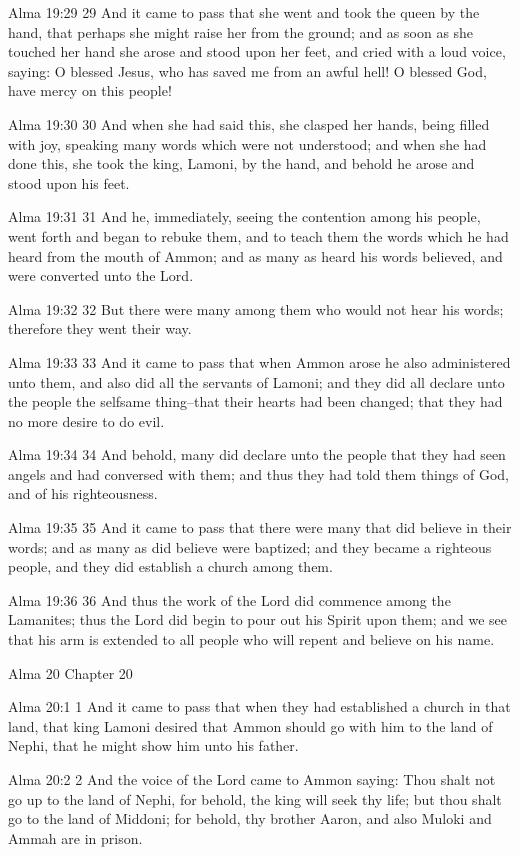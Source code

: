 Alma 19:29
 29 And it came to pass that she went and took the queen by the
hand, that perhaps she might raise her from the ground; and as
soon as she touched her hand she arose and stood upon her feet,
and cried with a loud voice, saying: O blessed Jesus, who has
saved me from an awful hell! O blessed God, have mercy on this
people!

Alma 19:30
 30 And when she had said this, she clasped her hands, being
filled with joy, speaking many words which were not understood;
and when she had done this, she took the king, Lamoni, by the
hand, and behold he arose and stood upon his feet.

Alma 19:31
 31 And he, immediately, seeing the contention among his people,
went forth and began to rebuke them, and to teach them the words
which he had heard from the mouth of Ammon; and as many as heard
his words believed, and were converted unto the Lord.

Alma 19:32
 32 But there were many among them who would not hear his words;
therefore they went their way.

Alma 19:33
 33 And it came to pass that when Ammon arose he also
administered unto them, and also did all the servants of Lamoni;
and they did all declare unto the people the selfsame thing--that
their hearts had been changed; that they had no more desire to do
evil.

Alma 19:34
 34 And behold, many did declare unto the people that they had
seen angels and had conversed with them; and thus they had told
them things of God, and of his righteousness.

Alma 19:35
 35 And it came to pass that there were many that did believe in
their words; and as many as did believe were baptized; and they
became a righteous people, and they did establish a church among
them.

Alma 19:36
 36 And thus the work of the Lord did commence among the
Lamanites; thus the Lord did begin to pour out his Spirit upon
them; and we see that his arm is extended to all people who will
repent and believe on his name.

Alma 20
Chapter 20

Alma 20:1
 1 And it came to pass that when they had established a church in
that land, that king Lamoni desired that Ammon should go with him
to the land of Nephi, that he might show him unto his father.

Alma 20:2
 2 And the voice of the Lord came to Ammon saying: Thou shalt not
go up to the land of Nephi, for behold, the king will seek thy
life; but thou shalt go to the land of Middoni; for behold, thy
brother Aaron, and also Muloki and Ammah are in prison.

